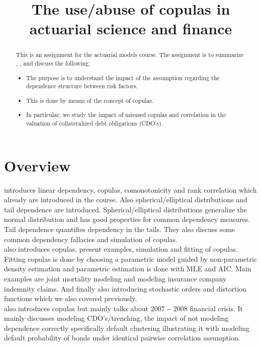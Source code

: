 \documentclass[a4paper,12pt]{article}
\title{The use/abuse of copulas in actuarial science and finance}
\date{}
\begin{document}
\maketitle

\begin{abstract}
    This is an assignment for the actuarial models course.
    The assignment is to summarize \cite{dempster_correlation_2002}, \cite{frees_understanding_1998},
    \cite{donnelly_devil_nodate} and discuss the following:

    \begin{itemize}
        \item  The purpose is to understand the impact of the assumption regarding
              the dependence structure between risk factors.
        \item  This is done by means of the concept of copulas.
        \item  In particular, we study the impact of misused copulas and correlation in the
              valuation of collateralized debt obligations (CDO's).
    \end{itemize}

\end{abstract}

\section{Overview}
\cite{dempster_correlation_2002} introduces linear dependency, copulas, comonotonicity and rank correlation which
already are introduced in the course. Also spherical/elliptical distributions and tail dependence are introduced.
Spherical/elliptical distributions generalize the normal distribution and has good properties for common dependency
measures.  Tail dependence quantifies dependency in the tails. They also discuss some
common dependency fallacies and simulation of copulas.\\

\cite{frees_understanding_1998} also introduces copulas, present examples, simulation
and fitting of copulas. Fitting copulas is done by choosing a parametric model
guided by non-parametric density estimation and parametric estimation is done
with MLE and AIC.
Main examples are joint mortality modeling and modeling insurance company indemnity claims.
And finally also introducing stochastic orders and distortion functions which we also covered previously. \\

\cite{donnelly_devil_nodate} also introduces copulas but mainly talks about $2007-2008$ financial crisis.
It mainly discusses modeling CDO's/trenching, the impact of not modeling dependence correctly specifically default
clustering illustrating it with modeling default probability of bonds under identical pairwise correlation
assumption.
\end{document}
